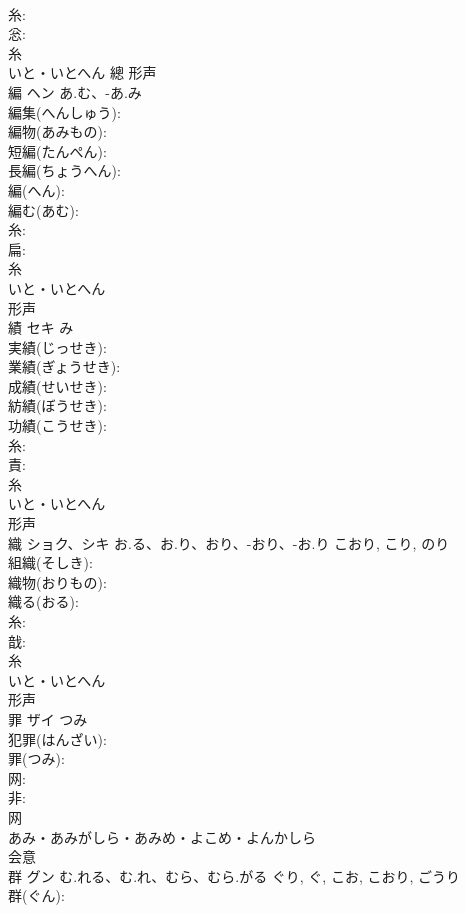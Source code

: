 \documentclass[8pt]{extreport}
\begin{document}
\begin{CJK}{UTF8}{min}
\\	糸: 
\\	忩: 
\\	糸	
\\	いと・いとへん	總	形声 
\\	編	ヘン	あ.む、-あ.み		
\\	編集(へんしゅう): 
\\	編物(あみもの): 
\\	短編(たんぺん): 
\\	長編(ちょうへん): 
\\	編(へん): 
\\	編む(あむ): 
\\	糸: 
\\	扁: 
\\	糸	
\\	いと・いとへん	
\\	形声 
\\	績	セキ		み	
\\	実績(じっせき): 
\\	業績(ぎょうせき): 
\\	成績(せいせき): 
\\	紡績(ぼうせき): 
\\	功績(こうせき): 
\\	糸: 
\\	責: 
\\	糸	
\\	いと・いとへん	
\\	形声 
\\	織	ショク、シキ	お.る、お.り、おり、-おり、-お.り	こおり, こり, のり	
\\	組織(そしき): 
\\	織物(おりもの): 
\\	織る(おる): 
\\	糸: 
\\	戠: 
\\	糸	
\\	いと・いとへん	
\\	形声 
\\	罪	ザイ	つみ		
\\	犯罪(はんざい): 
\\	罪(つみ): 
\\	网: 
\\	非: 
\\	网	
\\	あみ・あみがしら・あみめ・よこめ・よんかしら	
\\	会意 
\\	群	グン	む.れる、む.れ、むら、むら.がる	ぐり, ぐ, こお, こおり, ごうり	
\\	群(ぐん): 

\end{CJK}
\end{document}
